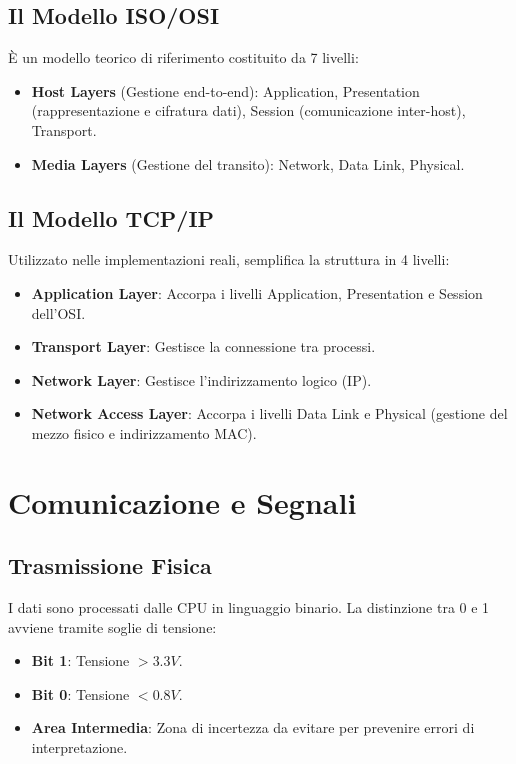 \documentclass[12pt,a4paper,oneside]{book}
\begin{document}
\subsection{Il Modello ISO/OSI}
È un modello teorico di riferimento costituito da 7 livelli:
\begin{itemize}
    \item \textbf{Host Layers} (Gestione end-to-end): Application, Presentation (rappresentazione e cifratura dati), Session (comunicazione inter-host), Transport.
    \item \textbf{Media Layers} (Gestione del transito): Network, Data Link, Physical.
\end{itemize}

\subsection{Il Modello TCP/IP}
Utilizzato nelle implementazioni reali, semplifica la struttura in 4 livelli:
\begin{itemize}
    \item \textbf{Application Layer}: Accorpa i livelli Application, Presentation e Session dell'OSI.
    \item \textbf{Transport Layer}: Gestisce la connessione tra processi.
    \item \textbf{Network Layer}: Gestisce l'indirizzamento logico (IP).
    \item \textbf{Network Access Layer}: Accorpa i livelli Data Link e Physical (gestione del mezzo fisico e indirizzamento MAC).
\end{itemize}

\section{Comunicazione e Segnali}

\subsection{Trasmissione Fisica}
I dati sono processati dalle CPU in linguaggio binario. La distinzione tra 0 e 1 avviene tramite soglie di tensione:
\begin{itemize}
    \item \textbf{Bit 1}: Tensione $> 3.3V$.
    \item \textbf{Bit 0}: Tensione $< 0.8V$.
    \item \textbf{Area Intermedia}: Zona di incertezza da evitare per prevenire errori di interpretazione.
\end{itemize}
\end{document}
